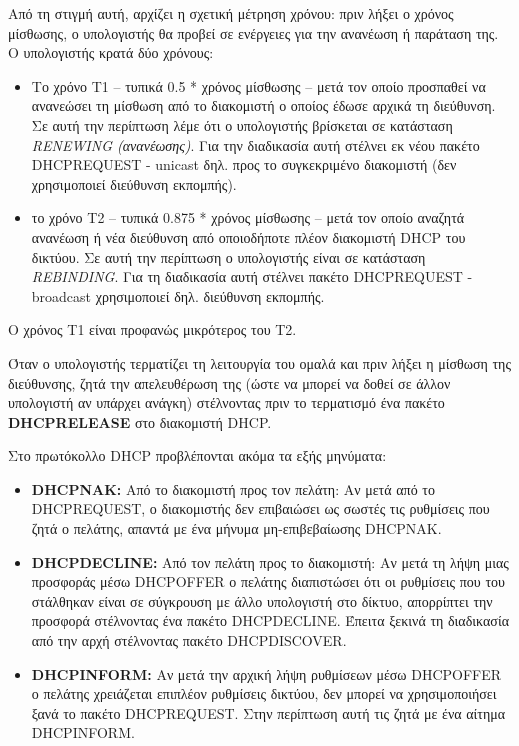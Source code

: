 Από τη στιγμή αυτή, αρχίζει η σχετική μέτρηση χρόνου: πριν λήξει ο χρόνος μίσθωσης, ο υπολογιστής θα προβεί σε ενέργειες για την ανανέωση ή παράταση της. Ο υπολογιστής κρατά δύο χρόνους:

\begin{itemize}
\item Το χρόνο Τ1 -- τυπικά 0.5 * χρόνος μίσθωσης -- μετά τον οποίο προσπαθεί να ανανεώσει τη μίσθωση από το διακομιστή ο οποίος έδωσε αρχικά τη διεύθυνση. Σε αυτή την περίπτωση λέμε ότι ο υπολογιστής βρίσκεται σε κατάσταση \emph{RENEWING (ανανέωσης)}. Για την διαδικασία αυτή στέλνει εκ νέου πακέτο DHCPREQUEST - unicast δηλ. προς το συγκεκριμένο διακομιστή (δεν χρησιμοποιεί διεύθυνση εκπομπής). 
\item το χρόνο Τ2 -- τυπικά 0.875 * χρόνος μίσθωσης -- μετά τον οποίο αναζητά ανανέωση ή νέα διεύθυνση από οποιοδήποτε πλέον διακομιστή DHCP του δικτύου. Σε αυτή την περίπτωση ο υπολογιστής είναι σε κατάσταση \emph{REBINDING}. Για τη διαδικασία αυτή στέλνει πακέτο DHCPREQUEST - broadcast χρησιμοποιεί δηλ. διεύθυνση εκπομπής. 
\end{itemize}

Ο χρόνος Τ1 είναι προφανώς μικρότερος του T2.

Όταν ο υπολογιστής τερματίζει τη λειτουργία του ομαλά και πριν λήξει η μίσθωση της διεύθυνσης, ζητά την απελευθέρωση της (ώστε να μπορεί να δοθεί σε άλλον υπολογιστή αν υπάρχει ανάγκη) στέλνοντας πριν το τερματισμό ένα πακέτο\\ \textbf{DHCPRELEASE} στο διακομιστή DHCP.

Στο πρωτόκολλο DHCP προβλέπονται ακόμα τα εξής μηνύματα:

\begin{itemize}
\item \textbf{DHCPNAK:} Από το διακομιστή προς τον πελάτη: Αν μετά από το\\ DHCPREQUEST, ο διακομιστής δεν επιβαιώσει ως σωστές τις ρυθμίσεις που ζητά ο πελάτης, απαντά με ένα μήνυμα μη-επιβεβαίωσης DHCPNAK.
\item \textbf{DHCPDECLINE:} Από τον πελάτη προς το διακομιστή: Αν μετά τη λήψη μιας προσφοράς μέσω DHCPOFFER ο πελάτης διαπιστώσει ότι οι ρυθμίσεις που του στάλθηκαν είναι σε σύγκρουση με άλλο υπολογιστή στο δίκτυο, απορρίπτει την προσφορά στέλνοντας ένα πακέτο DHCPDECLINE. Έπειτα ξεκινά τη διαδικασία από την αρχή στέλνοντας πακέτο DHCPDISCOVER.
\item \textbf{DHCPINFORM:} Αν μετά την αρχική λήψη ρυθμίσεων μέσω DHCPOFFER ο πελάτης χρειάζεται επιπλέον ρυθμίσεις δικτύου, δεν μπορεί να χρησιμοποιήσει ξανά το πακέτο DHCPREQUEST. Στην περίπτωση αυτή τις ζητά με ένα αίτημα DHCPINFORM. 
\end{itemize}

